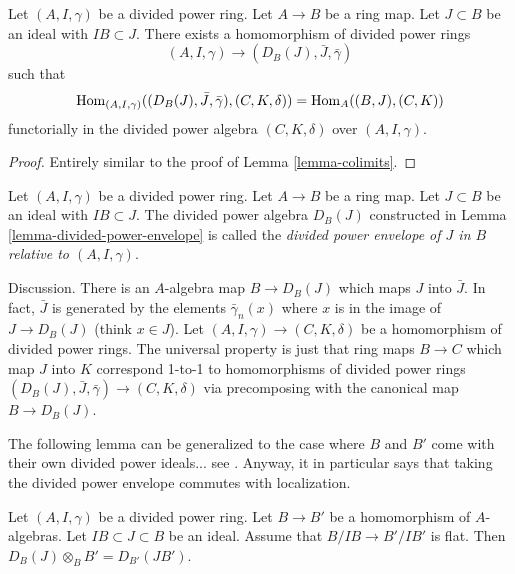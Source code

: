 \begin{lemma}
\label{lemma-divided-power-envelope}
Let $(A, I, \gamma)$ be a divided power ring.
Let $A \to B$ be a ring map. Let $J \subset B$ be an ideal
with $IB \subset J$. There exists a homomorphism of
divided power rings
$$
(A, I, \gamma) \longrightarrow (D_B(J), \bar J, \bar \gamma)
$$
such that
$$
\mathop{\rm Hom}\nolimits_{(A, I, \gamma)}((D_B(J), \bar J, \bar \gamma), (C, K, \delta))
=
\mathop{\rm Hom}\nolimits_A((B, J), (C, K))
$$
functorially in the divided power algebra $(C, K, \delta)$ over
$(A, I, \gamma)$.
\end{lemma}

\begin{proof}
Entirely similar to the proof of Lemma \ref{lemma-colimits}.
\end{proof}

\begin{definition}
\label{definition-divided-power-envelope}
Let $(A, I, \gamma)$ be a divided power ring.
Let $A \to B$ be a ring map. Let $J \subset B$ be an ideal
with $IB \subset J$. The divided power algebra $D_B(J)$
constructed in Lemma \ref{lemma-divided-power-envelope}
is called the {\it divided power envelope of $J$ in $B$
relative to $(A, I, \gamma)$}.
\end{definition}

\noindent
Discussion. There is an $A$-algebra map $B \to D_B(J)$ which
maps $J$ into $\bar J$. In fact, $\bar J$ is generated by
the elements $\bar\gamma_n(x)$ where $x$ is in the image of
$J \to D_B(J)$ (think $x \in J$). Let $(A, I, \gamma) \to (C, K, \delta)$
be a homomorphism of divided power rings. The universal property is
just that ring maps $B \to C$ which map $J$ into $K$ correspond
1-to-1 to homomorphisms of divided power rings
$(D_B(J), \bar J, \bar \gamma) \to (C, K, \delta)$ via precomposing with the
canonical map $B \to D_B(J)$.

\medskip\noindent
The following lemma can be generalized to the case where $B$ and $B'$
come with their own divided power ideals... see
\cite[Proposition 2.1.7]{dJ-crystalline}.
Anyway, it in particular says that taking the divided power
envelope commutes with localization.

\begin{lemma}
\label{lemma-flat-base-change-divided-power-envelope}
Let $(A, I, \gamma)$ be a divided power ring.
Let $B \to B'$ be a homomorphism of $A$-algebras.
Let $IB \subset J \subset B$ be an ideal.
Assume that $B/IB \to B'/IB'$ is flat.
Then $D_B(J) \otimes_B B' = D_{B'}(JB')$.
\end{lemma}

